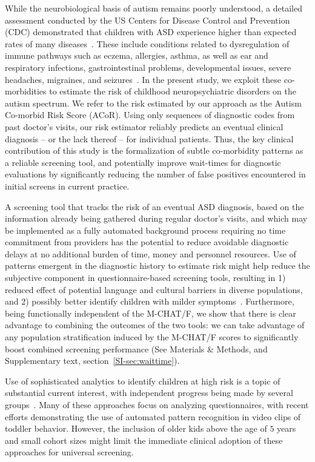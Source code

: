 \documentclass[onecolumn,,10pt]{IEEEtran}
\def\acor{ACoR\xspace}
\begin{document}
While the neurobiological basis of autism remains poorly understood,  a detailed assessment conducted by the US Centers for Disease Control and Prevention (CDC) demonstrated that  children with ASD experience  higher than expected rates of many diseases~\cite{cdc}. These include conditions related to dysregulation of immune pathways such as eczema, allergies, asthma, as well as ear and respiratory infections, gastrointestinal problems, developmental issues, severe headaches, migraines, and seizures~\cite{pmid30733689,pmid22511918}. In the present study, we exploit   these   co-morbidities to estimate the risk of  childhood neuropsychiatric disorders on the autism spectrum. We refer to the risk estimated by our approach as the Autism Co-morbid Risk Score (\acor). Using only sequences of diagnostic codes from past doctor's visits, our risk estimator reliably
predicts an eventual clinical  diagnosis -- or the lack thereof -- for individual patients.
Thus, the key clinical  contribution of this study is the formalization  of subtle co-morbidity patterns as a reliable screening tool, and potentially  improve wait-times for diagnostic evaluations by significantly reducing the number of false positives encountered in initial screens in current practice.

 
A  screening  tool that tracks the risk of an eventual ASD diagnosis,  based  on the information already being gathered during regular doctor's visits, and which may be implemented as a  fully automated background process requiring no time commitment from providers has the potential to reduce avoidable diagnostic  delays at no additional burden of time, money and personnel resources.  Use of patterns emergent in  the diagnostic history to estimate risk might help reduce the subjective component in questionnaire-based screening tools, resulting in 1) reduced effect of potential language and cultural barriers in diverse populations, and 2) possibly better identify children with milder symptoms~\cite{hyman2020identification}.
Furthermore, being functionally independent of the M-CHAT/F, we show that there is clear advantage to combining the outcomes of the two tools: we can take advantage of any population stratification induced by the M-CHAT/F scores to significantly boost combined screening performance (See Materials \&  Methods, and Supplementary text, section~\ref{SI-sec:waittime}).
 
Use of sophisticated analytics to identify children at high risk is a topic of substantial current interest, with independent progress being made by several groups~\cite{hyde2019applications,abbas2020multi,duda2016clinical,duda2014testing,fusaro2014potential,wall2012use,wall2012use2}. Many of these approaches  focus on analyzing questionnaires, with recent efforts demonstrating the use of  automated pattern recognition in video clips of toddler behavior. However, the inclusion of older kids above the age of  $5$ years and  small cohort sizes might limit the immediate clinical adoption of these approaches for universal screening.
\end{document}
